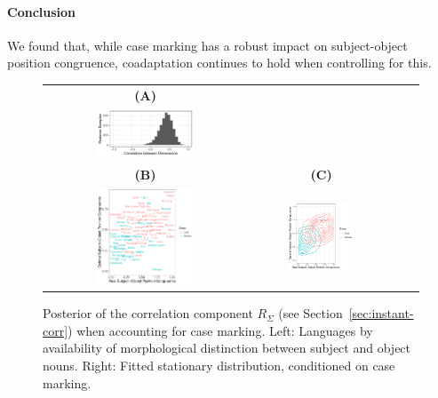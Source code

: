 \documentclass[11pt,a4paper]{article}
\begin{document}
\paragraph{Conclusion}
We found that, while case marking has a robust impact on subject-object position congruence, coadaptation continues to hold when controlling for this.

\begin{figure}
    \centering
	\begin{tabular}{cccc}
		\textbf{(A)} \\
    \includegraphics[width=0.5\textwidth]{../change/ornuhl-binom/case/separate_b/fits/corr_sigma.pdf} \\
		\textbf{(B)} & \textbf{(C)} \\
		\includegraphics[width=0.5\textwidth]{../analysis/figures/by_patient_marking.pdf} &
    \includegraphics[width=0.5\textwidth]{../change/ornuhl-binom/case/separate_b/fits/stationary_case.pdf}
	\end{tabular}
    \caption{Posterior of the correlation component $R_\Sigma$ (see Section~\ref{sec:instant-corr}) when accounting for case marking. Left: Languages by availability of morphological distinction between subject and object nouns. Right: Fitted stationary distribution, conditioned on case marking.}
    \label{fig:langs-case}
\end{figure}
\end{document}
